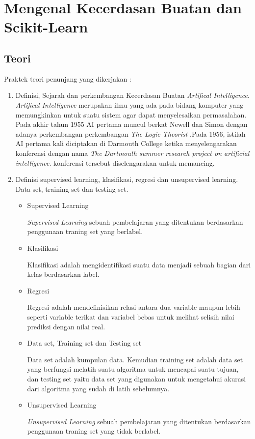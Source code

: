 \chapter{Mengenal Kecerdasan Buatan dan Scikit-Learn}

\section{Teori}
Praktek teori penunjang yang dikerjakan :
\begin{enumerate}
\item
Definisi, Sejarah dan perkembangan Kecerdasan Buatan \textit{Artifical Intelligence}. \textit{Artifical Intelligence} merupakan ilmu yang ada pada bidang komputer yang memungkinkan untuk suatu sistem agar dapat menyelesaikan permasalahan.\\
Pada akhir tahun 1955 AI pertama muncul berkat Newell dan Simon dengan adanya perkembangan perkembangan \textit{The Logic Theorist} .Pada 1956, istilah AI pertama kali diciptakan di Darmouth College ketika menyelengarakan konferensi dengan nama \textit{The Dartmouth summer research project on artificial intelligence}. konferensi tersebut diselengarakan untuk memancing.

\item
Definisi supervised learning, klasifikasi, regresi dan unsupervised learning. Data set, training set dan testing set.
\begin{itemize}

	\item Supervised Learning
    \par
    \textit{Supervised Learning} sebuah pembelajaran yang ditentukan berdasarkan penggunaan traning set yang berlabel.

    \item Klasifikasi
    \par
    Klasifikasi adalah mengidentifikasi suatu data menjadi sebuah bagian dari kelas berdasarkan label.

	\item Regresi
	\par 
	Regresi adalah mendefinisikan relasi antara dua variable maupun lebih seperti variable terikat dan variabel bebas untuk melihat selisih nilai prediksi dengan nilai real.

    \item Data set, Training set dan Testing set
    \par
    Data set adalah kumpulan data. Kemudian training set adalah  data set yang berfungsi melatih suatu algoritma untuk mencapai suatu tujuan, dan testing set yaitu data set yang digunakan untuk mengetahui akurasi dari algoritma yang sudah di latih sebelumnya.

	\item Unsupervised Learning
	\par
	\textit{Unsupervised Learning} sebuah pembelajaran yang ditentukan berdasarkan penggunaan traning set yang tidak berlabel. 

\end{itemize}
\end{enumerate}


